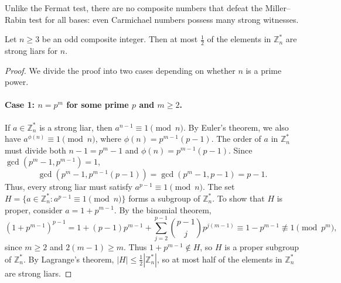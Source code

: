 Unlike the Fermat test, there are no composite numbers that defeat the Miller--Rabin test for all bases: even Carmichael numbers possess many strong witnesses.

\begin{theorem}\label{thm:strong-liars-bound}
    Let \(n \geq 3\) be an odd composite integer.
    Then at most \(\frac{1}{2}\) of the elements in \(\mathbb{Z}_n^*\) are strong liars for \(n\).
\end{theorem}

\begin{proof}
    We divide the proof into two cases depending on whether \(n\) is a prime power.

    \paragraph{Case 1: \(n = p^m\) for some prime \(p\) and \(m \geq 2\).}
    If \(a \in \mathbb{Z}_n^*\) is a strong liar, then \(a^{n-1} \equiv 1 \pmod{n}\).
    By Euler's theorem, we also have \(a^{\phi(n)} \equiv 1 \pmod{n}\), where \(\phi(n) = p^{m-1}(p-1)\).
    The order of \(a\) in \(\mathbb{Z}_n^*\) must divide both \(n - 1 = p^m - 1\) and \(\phi(n) = p^{m-1}(p-1)\).
    Since \(\gcd(p^m - 1, p^{m-1}) = 1\),
    \[
        \gcd(p^m - 1, p^{m-1}(p-1)) = \gcd(p^m - 1, p - 1) = p - 1.
    \]
    Thus, every strong liar must satisfy \(a^{p-1} \equiv 1 \pmod{n}\).
    The set \(H = \{a \in \mathbb{Z}_n^* : a^{p-1} \equiv 1 \pmod{n}\}\) forms a subgroup of \(\mathbb{Z}_n^*\).
    To show that \(H\) is proper, consider \(a = 1 + p^{m-1}\).
    By the binomial theorem,
    \[
        (1 + p^{m-1})^{p-1} = 1 + (p - 1)p^{m-1} + \sum_{j=2}^{p-1} \binom{p-1}{j} p^{j(m-1)} \equiv 1 - p^{m-1} \not\equiv 1 \pmod{p^m},
    \]
    since \(m \geq 2\) and \(2(m-1) \geq m\).
    Thus \(1 + p^{m-1} \notin H\), so \(H\) is a proper subgroup of \(\mathbb{Z}_n^*\).
    By Lagrange's theorem, \(|H| \leq \frac{1}{2} |\mathbb{Z}_n^*|\), so at most half of the elements in \(\mathbb{Z}_n^*\) are strong liars.


\end{proof}
